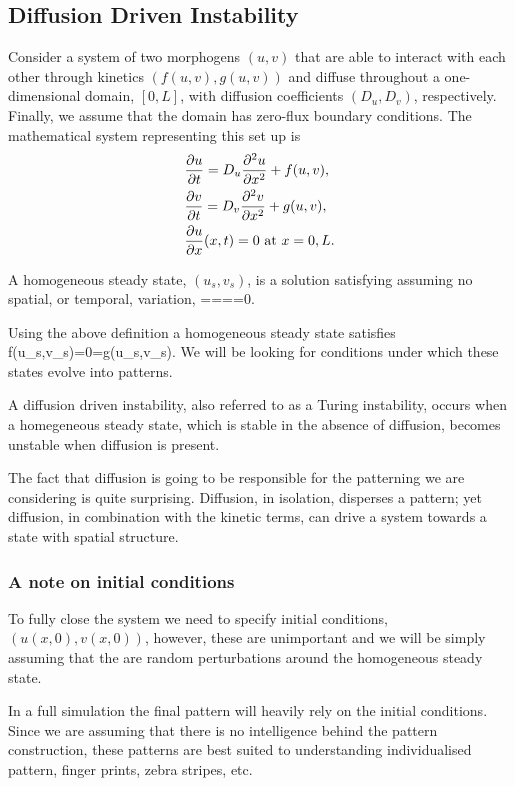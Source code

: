 \subsection{Diffusion Driven Instability}
Consider a system of two morphogens $(u,v)$ that are able to interact with each other through kinetics $(f(u,v),g(u,v))$ and diffuse throughout a one-dimensional domain, $[0,L]$, with diffusion coefficients $(D_u,D_v)$, respectively. Finally, we assume that the domain has zero-flux boundary conditions. The mathematical system representing this set up is 
\begin{align}
&\frac{\partial u}{\partial t} = D_u\frac{\partial^2 u}{\partial x^2} + f(u,v),\label{RDu}\\
&\frac{\partial v}{\partial t} = D_v\frac{\partial^2 v}{\partial x^2} + g(u,v),\label{RDv}\\
&\frac{\partial u}{\partial x}(x,t)=0 \textrm{ at } x=0,L.\label{BCs}
\end{align}

\begin{defin}
A homogeneous steady state, $(u_s,v_s)$, is a solution satisfying  assuming no spatial, or temporal, variation, \ie
\bb
{}====0.
\ee
\end{defin}

Using the above definition a homogeneous steady state satisfies
\bb
f(u_s,v_s)=0=g(u_s,v_s).
\ee
We will be looking for conditions under which these states evolve into patterns.
\begin{defin}\label{DDI} A diffusion driven instability, also referred to as a Turing instability, occurs when a homegeneous steady state, which is stable in the absence of diffusion, becomes unstable when diffusion is present.
\end{defin}
The fact that diffusion is going to be responsible for the patterning we are considering is quite surprising. Diffusion, in isolation, disperses a pattern; yet diffusion, in combination with the kinetic terms, can drive a system towards a state with spatial structure.

\subsubsection{A note on initial conditions}
To fully close the system we need to specify initial conditions, $(u(x,0),v(x,0))$, however, these are unimportant and we will be simply assuming that the are random perturbations around the homogeneous steady state.

In a full simulation the final pattern will heavily rely on the initial conditions. Since we are assuming that there is no intelligence behind the pattern construction, these patterns are best suited to understanding individualised pattern, \eg finger prints, zebra stripes, etc.

